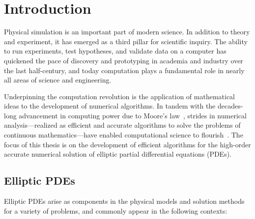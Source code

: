 \chapter{Introduction}\label{sec:\chap}


Physical simulation is an important part of modern science. In addition to theory and experiment, it has emerged as a third pillar for scientific inquiry. The ability to run experiments, test hypotheses, and validate data on a computer has quickened the pace of discovery and prototyping in academia and industry over the last half-century, and today computation plays a fundamental role in nearly all areas of science and engineering.

Underpinning the computation revolution is the application of mathematical ideas to the development of numerical algorithms. In tandem with the decades-long advancement in computing power due to Moore's law~\cite{Moore}, strides in numerical analysis---realized as efficient and accurate algorithms to solve the problems of continuous mathematics---have enabled computational science to flourish~\cite{CSE_Outlook_SIAM}. The focus of this thesis is on the development of efficient algorithms for the high-order accurate numerical solution of elliptic partial differential equations (PDEs). %

\section{Elliptic PDEs}

Elliptic PDEs arise as components in the physical models and solution methods for a variety of problems, and commonly appear in the following contexts:

